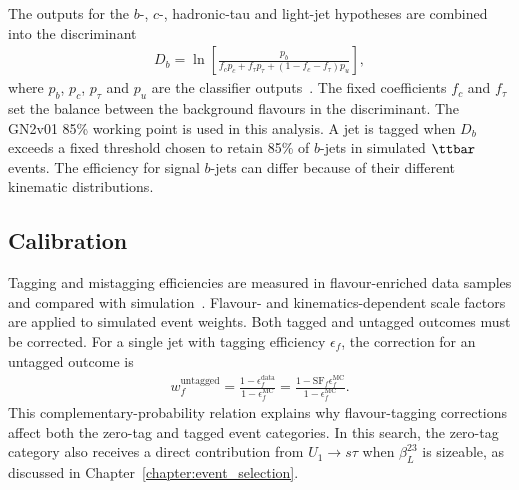 The outputs for the $b$-, $c$-, hadronic-tau and light-jet hypotheses are combined into the discriminant
\begin{align}
    D_b=\ln\!\left[
    \frac{p_b}{f_c p_c+f_\tau p_\tau+(1-f_c-f_\tau)p_u}
    \right],
    \label{eq:ch6_gn2_discriminant}
\end{align}
where $p_b$, $p_c$, $p_\tau$ and $p_u$ are the classifier outputs~\cite{ATLAS2026GN2}.
The fixed coefficients $f_c$ and $f_\tau$ set the balance between the background flavours in the discriminant.
The GN2v01 85\% working point is used in this analysis.
A jet is tagged when $D_b$ exceeds a fixed threshold chosen to retain 85\% of $b$-jets in simulated $\ttbar$ events.
The efficiency for signal $b$-jets can differ because of their different kinematic distributions.

\subsection{Calibration}

Tagging and mistagging efficiencies are measured in flavour-enriched data samples and compared with simulation~\cite{ATLAS2026GN2}.
Flavour- and kinematics-dependent scale factors are applied to simulated event weights.
Both tagged and untagged outcomes must be corrected.
For a single jet with tagging efficiency $\epsilon_f$, the correction for an untagged outcome is
\begin{align}
    w_f^{\mathrm{untagged}}
    =\frac{1-\epsilon_f^{\mathrm{data}}}{1-\epsilon_f^{\mathrm{MC}}}
    =\frac{1-\mathrm{SF}_f\epsilon_f^{\mathrm{MC}}}{1-\epsilon_f^{\mathrm{MC}}}.
    \label{eq:ch6_btag_untagged}
\end{align}
This complementary-probability relation explains why flavour-tagging corrections affect both the zero-tag and tagged event categories.
In this search, the zero-tag category also receives a direct contribution from $U_1\rightarrow s\tau$ when $\beta_L^{23}$ is sizeable, as discussed in Chapter~\ref{chapter:event_selection}.
